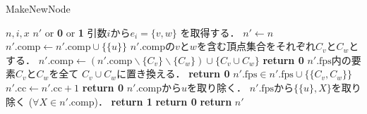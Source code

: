 \begin{breakablealgorithm}
  \caption{MakeNewNode}
  \label{make_new_node}
  \begin{algorithmic}[1]
    \Require $n,i,x$
    \Ensure $n'$ or \textbf{0} or \textbf{1}
    \State 引数$i$から$e_i=\{v,w\}$ を取得する．
    \State $n' \gets n$
        \State $n'.\mathrm{comp} \gets n'.\mathrm{comp} \cup \{\{u\}\}$
      \EndIf
    \EndFor
    \State $n'.\mathrm{comp}$の$v$と$w$を含む頂点集合をそれぞれ$C_v$と$C_w$とする．
      \State $n'.\mathrm{comp} \gets (n'.\mathrm{comp} \backslash \{C_v\} \backslash \{C_w\})
        \cup \{C_v \cup C_w\}$
        \State \textbf{return 0}
      \Else
        \State $n'.\mathrm{fps}$内の要素$C_v$と$C_w$を全て
          $C_v \cup C_w$に置き換える．
      \EndIf
    \Else
        \State \textbf{return 0}
      \Else
        \State $n'.\mathrm{fps} \in n'.\mathrm{fps} \cup \{\{C_v, C_w\}\}$
      \EndIf
    \EndIf
        \State $n'.\mathrm{cc} \gets n'.\mathrm{cc} + 1$
          \State \textbf{return 0}
        \EndIf
      \EndIf
      \State $n'.\mathrm{comp}$から$u$を取り除く．
      \State $n'.\mathrm{fps}$から$\{\{u\},X\}$を取り除く
        ($\forall X \in n'.\mathrm{comp}$)．
    \EndIf
  \EndFor
      \State \textbf{return 1}
    \Else
      \State \textbf{return 0}
    \EndIf
  \EndIf
  \State \textbf{return }$n'$
  \end{algorithmic}
\end{breakablealgorithm}

